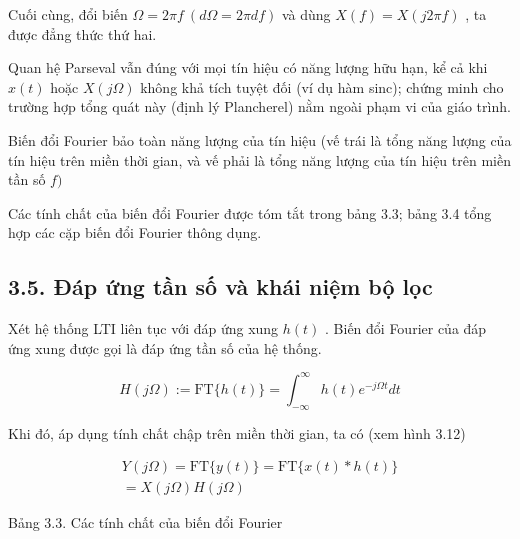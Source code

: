 \documentclass[
  10
]{article}
\begin{document}
Cuối cùng, đổi biến \(\Omega = 2 \pi f \ ( d \Omega = 2 \pi d f )\) và
dùng \(X ( f ) = X ( j 2 \pi f )\) , ta được đẳng thức thứ hai. 

Quan hệ Parseval vẫn đúng với mọi tín hiệu có năng lượng hữu hạn, kể cả
khi \(x ( t )\) hoặc \(X ( j \Omega )\) không khả tích tuyệt đối (ví dụ
hàm sinc); chứng minh cho trường hợp tổng quát này (định lý Plancherel)
nằm ngoài phạm vi của giáo trình.

Biến đổi Fourier bảo toàn năng lượng của tín hiệu (vế trái là tổng năng
lượng của tín hiệu trên miền thời gian, và vế phải là tổng năng lượng
của tín hiệu trên miền tần số \(f )\)

Các tính chất của biến đổi Fourier được tóm tắt trong bảng 3.3; bảng 3.4
tổng hợp các cặp biến đổi Fourier thông dụng.

\subsection{3.5. Đáp ứng tần số và khái niệm bộ
lọc}\label{ux111uxe1p-ux1ee9ng-tux1ea7n-sux1ed1-vuxe0-khuxe1i-niux1ec7m-bux1ed9-lux1ecdc}

Xét hệ thống LTI liên tục với đáp ứng xung \(h ( t )\) . Biến đổi
Fourier của đáp ứng xung được gọi là đáp ứng tần số của hệ thống.

\[
H (j \Omega) := \mathrm{FT} \{h (t) \} = \int_ {- \infty} ^ {\infty} h (t) e ^ {- j \Omega t} d t\tag{3.15}
\]

Khi đó, áp dụng tính chất chập trên miền thời gian, ta có (xem hình
3.12)

\[
\begin{array}{c} Y (j \Omega) = \mathrm{FT} \{y (t) \} = \mathrm{FT} \{x (t) * h (t) \} \\ = X (j \Omega) H (j \Omega) \end{array}\tag{3.16}
\]

Bảng 3.3. Các tính chất của biến đổi Fourier
\end{document}
